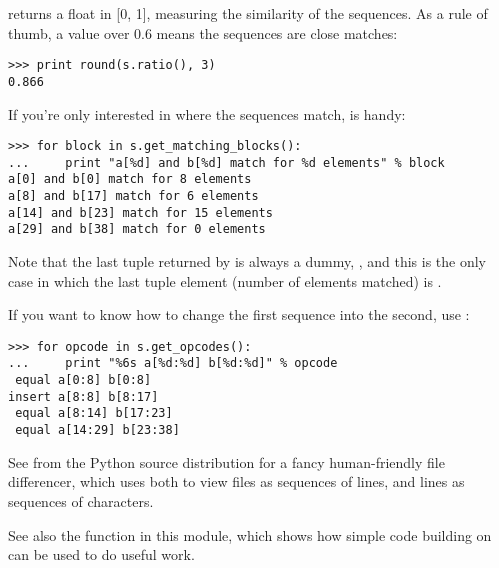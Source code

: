  returns a float in [0, 1], measuring the similarity
of the sequences.  As a rule of thumb, a  value over
0.6 means the sequences are close matches:

\begin{verbatim}
>>> print round(s.ratio(), 3)
0.866
\end{verbatim}

If you're only interested in where the sequences match,
 is handy:

\begin{verbatim}
>>> for block in s.get_matching_blocks():
...     print "a[%d] and b[%d] match for %d elements" % block
a[0] and b[0] match for 8 elements
a[8] and b[17] match for 6 elements
a[14] and b[23] match for 15 elements
a[29] and b[38] match for 0 elements
\end{verbatim}

Note that the last tuple returned by  is
always a dummy, , and this is
the only case in which the last tuple element (number of elements
matched) is .

If you want to know how to change the first sequence into the second,
use :

\begin{verbatim}
>>> for opcode in s.get_opcodes():
...     print "%6s a[%d:%d] b[%d:%d]" % opcode
 equal a[0:8] b[0:8]
insert a[8:8] b[8:17]
 equal a[8:14] b[17:23]
 equal a[14:29] b[23:38]
\end{verbatim}

See  from the Python source distribution
for a fancy human-friendly file differencer, which uses
 both to view files as sequences of lines, and
lines as sequences of characters.

See also the function  in this module,
which shows how simple code building on  can be
used to do useful work.
